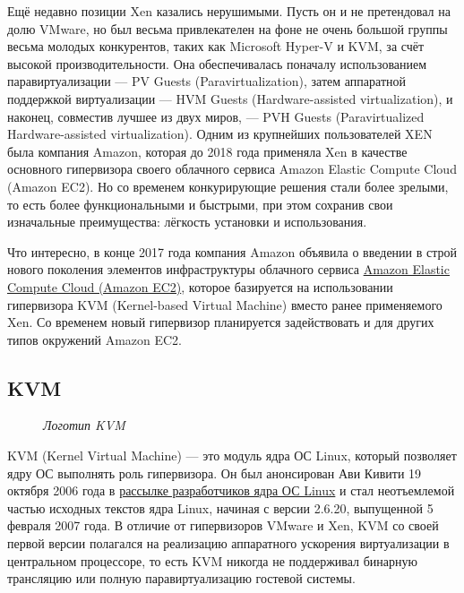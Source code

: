 \documentclass[14pt, a4paper]{article}
\begin{document}
Ещё недавно позиции Xen казались нерушимыми. Пусть он и не претендовал на долю VMware, но был
весьма привлекателен на фоне не очень большой группы весьма молодых конкурентов, таких как
Microsoft Hyper-V и KVM, за счёт высокой производительности. Она обеспечивалась поначалу
использованием паравиртуализации — PV Guests (Paravirtualization), затем аппаратной поддержкой
виртуализации — HVM Guests (Hardware-assisted virtualization), и наконец, совместив лучшее из двух
миров, — PVH Guests (Paravirtualized Hardware-assisted virtualization). Одним из крупнейших
пользователей XEN была компания Amazon, которая до 2018 года применяла Xen в качестве
основного гипервизора своего облачного сервиса Amazon Elastic Compute Cloud (Amazon EC2). Но со
временем конкурирующие решения стали более зрелыми, то есть более функциональными и
быстрыми, при этом сохранив свои изначальные преимущества: лёгкость установки и использования.

Что интересно, в конце 2017 года компания Amazon объявила о введении в строй нового поколения
элементов инфраструктуры облачного сервиса \href{http://aws_writes_new_kvm_based_hypervisor_to_make_its_cloud_go_faster/}{Amazon Elastic Compute Cloud (Amazon EC2)}, которое
базируется на использовании гипервизора KVM (Kernel-based Virtual Machine) вместо ранее
применяемого Xen. Со временем новый гипервизор планируется задействовать и для других типов
окружений Amazon EC2.\newpage

\subsection*{KVM}

\begin{figure}[h]%
    \centering
    \caption*{\textit{Логотип KVM}}
    \label{3.0} %
\end{figure}

KVM (Kernel Virtual Machine) — это модуль ядра ОС Linux, который позволяет ядру ОС выполнять роль
гипервизора. Он был анонсирован Ави Кивити 19 октября 2006 года в \href{http://lkml.iu.edu/hypermail/linux/kernel/0610.2/1369.html}{рассылке разработчиков ядра
ОС Linux} и стал неотъемлемой частью исходных текстов ядра Linux, начиная с версии 2.6.20,
выпущенной 5 февраля 2007 года. В отличие от гипервизоров VMware и Xen, KVM со своей первой
версии полагался на реализацию аппаратного ускорения виртуализации в центральном процессоре,
то есть KVM никогда не поддерживал бинарную трансляцию или полную паравиртуализацию гостевой
системы.
\end{document}
